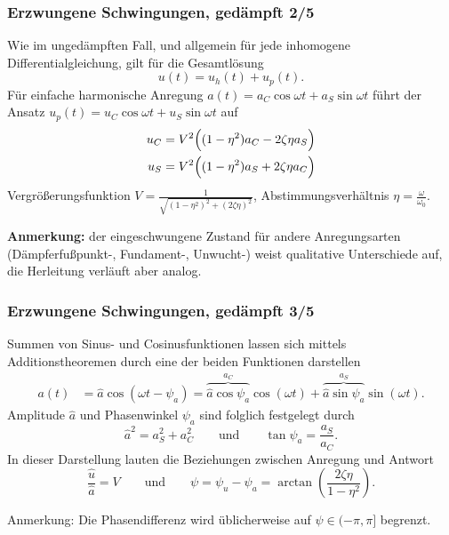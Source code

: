 \begin{frame}
\frametitle{Erzwungene Schwingungen, {\normalsize gedämpft 2/5}}
Wie im ungedämpften Fall, und allgemein für jede inhomogene Differentialgleichung, gilt für die Gesamtlösung
\begin{equation*}
 u(t)=u_h(t)+u_p(t).
\end{equation*}
Für einfache harmonische Anregung $a(t)=a_C\cos\omega t + a_S \sin \omega t$
führt der Ansatz $u_p(t)=u_C\cos\omega t + u_S\sin\omega t$ auf
\begin{align*}
u_C&= V^2 \Bigl( (1-\eta^2)a_C-2\zeta\eta a_S \Bigl)\\
u_S&= V^2 \Bigl( (1-\eta^2)a_S+2\zeta\eta a_C \Bigl)
\end{align*}
Vergrößerungsfunktion $V=\frac{1}{\sqrt{(1-\eta^2)^2+(2\zeta\eta)^2}}$, \hfill Abstimmungsverhältnis $\eta= \frac{\omega}{\omega_0}$.
\smallskip
\begin{center}
 \textbf{Anmerkung:} der eingeschwungene Zustand für andere Anregungsarten (Dämpferfußpunkt-, Fundament-, Unwucht-) weist qualitative Unterschiede auf, die Herleitung verläuft aber analog.
\end{center}
\end{frame}

\begin{frame}
\frametitle{Erzwungene Schwingungen, {\normalsize gedämpft 3/5}}
Summen von Sinus- und Cosinusfunktionen lassen sich mittels
Additionstheoremen durch eine der beiden Funktionen darstellen
\begin{align*}
a(t)&= \hat{a}\cos(\omega t - \psi_a) = 
 \overbrace{\hat{a}\cos\psi_a}^{a_C} \cos(\omega t) +
 \overbrace{\hat{a}\sin\psi_a}^{a_S} \sin(\omega t).%
 \end{align*}
 Amplitude $\hat{a}$ und Phasenwinkel $\psi_a$ sind folglich festgelegt durch
 \begin{equation*}
  \hat{a}^2 = a_S^2+a_C^2 \qquad \text{und} \qquad
  \tan\psi_a = \frac{a_S}{a_C}. 
\end{equation*}
In dieser Darstellung lauten die Beziehungen zwischen Anregung und Antwort
\begin{equation*}
\frac{\hat{u}}{\hat{a}}=V \qquad \text{und} \qquad
\psi=\psi_u -\psi_a =  \arctan \left(\frac{2\zeta\eta}{1-\eta^2}\right).
\end{equation*}

Anmerkung: Die Phasendifferenz wird üblicherweise auf $\psi\in(-\pi,\pi]$ begrenzt.
\end{frame}


